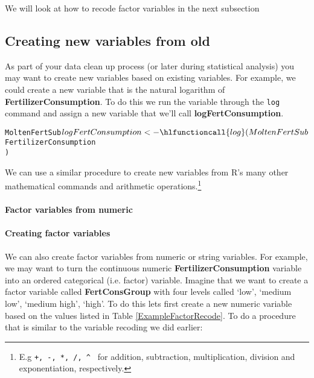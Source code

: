 We will look at how to recode factor variables in the next subsection

\subsection{Creating new variables from old}

As part of your data clean up process (or later during statistical analysis) you may want to create new variables based on existing variables. For example, we could create a new variable that is the natural logarithm of \textbf{FertilizerConsumption}. To do this we run the variable through the \texttt{log} command and assign a new variable that we'll call \textbf{logFertConsumption}.

{\small
\begin{knitrout}
\color{fgcolor}\begin{kframe}
\begin{alltt}
MoltenFertSub$logFertConsumption <- \hlfunctioncall{log}(
                                    MoltenFertSub$FertilizerConsumption
                                    )
\end{alltt}
\end{kframe}
\end{knitrout}

}

\noindent We can use a similar procedure to create new variables from R's many other mathematical commands and arithmetic operations.\footnote{E.g \verb|+, -, *, /, ^ | for addition, subtraction, multiplication, division and exponentiation, respectively.}
\paragraph{Factor variables from numeric}

\paragraph{Creating factor variables}

We can also create factor variables from numeric or string variables. For example, we may want to turn the continuous numeric \textbf{FertilizerConsumption} variable into an ordered categorical (i.e. factor) variable. Imagine that we want to create a factor variable called \textbf{FertConsGroup} with four levels called `low', `medium low', `medium high', `high'. To do this lets first create a new numeric variable based on the values listed in Table \ref{ExampleFactorRecode}. To do a procedure that is similar to the variable recoding we did earlier:





